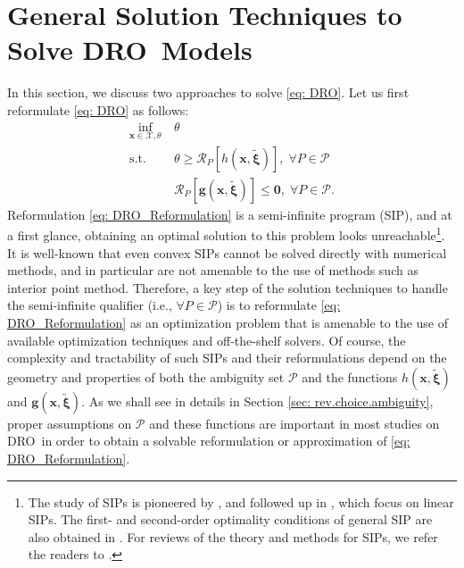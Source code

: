 \documentclass[final,onefignum,onetabnum]{class}
\newcommand{\rrisk}[2]{\Cs{R}_{#1} \left[ #2 \right]}
\newcommand{\bs}[1]{\boldsymbol{#1}} %
\newcommand{\Cs}[1]{\mathcal{#1}} %
\newcommand{\txi}{\tilde{\bs{\xi}}}
\newcommand{\dro}{DRO}
\newcommand{\sip}{SIP}
\begin{document}
\section{General Solution Techniques to Solve \dro\  Models}
\label{sec: rev.solution}

In this section, we discuss two approaches to solve \eqref{eq: DRO}. Let us first reformulate  \eqref{eq: DRO} as follows:
\begin{subequations}
\label{eq: DRO_Reformulation}
	\begin{align}
	\inf_{\bs{x} \in \Cs{X}, \theta } \  & \theta \\
	\text{s.t.} \quad & \theta \ge  \rrisk{P}{h(\bs{x},\txi)}, \; \forall P \in \Cs{P}\\
		& \rrisk{P}{\bs{g}(\bs{x},\txi)} \le \bs{0}, \; \forall P \in \Cs{P}.
	\end{align}	
\end{subequations}
Reformulation \eqref{eq: DRO_Reformulation} is a semi-infinite program (\sip), and at a first glance,  obtaining an optimal solution to this problem looks unreachable\footnote{
The study of \sip s is pioneered by  \citet{haar1924}, and followed up in \citet{charnes1962duality,charnes1963duality,charnes1969theory}, which focus on linear \sip s. The first- and second-order optimality conditions of general SIP are also obtained in \citet{hettich1977conditions,hettich1978SIP,hettich1995,nuernberger1985SIP,nuernberger1985Opt,still1999}. For reviews of the theory and methods for \sip s, we refer the readers to \citet{hettich1993,reemtsen1998,lopez2007}.}.
It is  well-known that even  convex \sip s cannot be solved directly with numerical methods, and in particular are not amenable to the use of methods such as interior point method. Therefore, a key step of the solution techniques to handle  the semi-infinite qualifier (i.e., $\forall P \in \Cs{P}$)  is to reformulate  \eqref{eq: DRO_Reformulation} as  an optimization problem that is amenable to the use of available optimization techniques and off-the-shelf solvers.  Of course, the complexity and tractability of such \sip s and their reformulations depend on the geometry and properties of both the ambiguity set $\Cs{P}$ and the functions $h(\bs{x},\txi)$ and $\bs{g}(\bs{x},\txi)$. As we shall see in details in Section \ref{sec: rev.choice.ambiguity}, proper assumptions on    $\Cs{P}$ and these functions are important in  most studies on \dro\ in order to obtain a solvable reformulation or approximation of \eqref{eq: DRO_Reformulation}.
\end{document}
